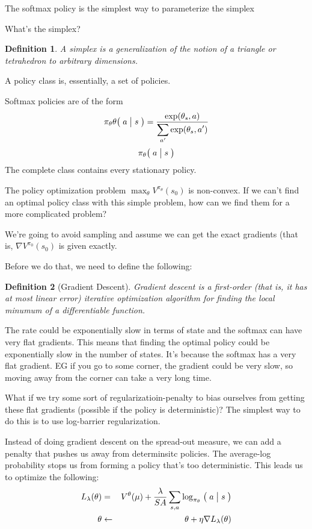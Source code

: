\documentclass[12pt,reqno]{amsart}
\newtheorem{defn}{Definition}
\newcommand{\Cond}[2]{\bigm( {#1} \bigm\vert {#2}\bigm)}
\begin{document}
The softmax policy is the simplest way to parameterize the simplex

What's the simplex?
\begin{defn}
        A simplex is a generalization of the notion of a triangle or tetrahedron to arbitrary dimensions.
\end{defn}
A policy class is, essentially, a set of policies.

Softmax policies are of the form
\begin{equation}
\pi_\theta\theta{\Cond{a}{s}}=\frac{\displaystyle \exp(\theta_s,a)}{\displaystyle \sum_{a'}\exp(\theta_s,a')}
\end{equation}
\begin{equation}
\pi_\theta{\Cond{a}{s}}
\end{equation}
The complete class contains every stationary policy.

The policy optimization problem $\max_{\theta} V^{\pi_{\theta}}(s_0)$ is non-convex. If we can't find an optimal policy class with this simple problem, how can we find them for a more complicated problem?

We're going to avoid sampling and assume we can get the exact gradients (that is, $\nabla V^{\pi_0}(s_0)$ is given exactly.

Before we do that, we need to define the following:

\begin{shaded}
\begin{defn}[Gradient Descent]
Gradient descent is a first-order (that is, it has at most linear error) iterative optimization algorithm for finding the local minumum of a differentiable function.
\end{defn}
\end{shaded}

The rate could be exponentially slow in terms of state and the softmax can have very flat gradients. This means that finding the optimal policy could be exponentially slow in the number of states. It's because the softmax has a very flat gradient. EG if you go to some corner, the gradient could be very slow, so moving away from the corner can take a very long time.

What if we try some sort of regularizatioin-penalty to bias ourselves from getting these flat gradients (possible if the policy is deterministic)? The simplest way to do this is to use log-barrier regularization.

Instead of doing gradient descent on the spread-out measure, we can add a penalty that pushes us away from determinsitc policies. The average-log probability stops us from forming a policy that's too deterministic. This leads us to optimize the following:
\begin{eqnarray}
L_\lambda(\theta) &=& V^\theta(\mu) + \frac{\lambda}{SA}\sum\limits_{s,a}\log_{\pi_\theta}\Cond{a}{s}\\
\theta  &\leftarrow& \theta + \eta \nabla L_\lambda(\theta)
\end{eqnarray}
\end{document}
